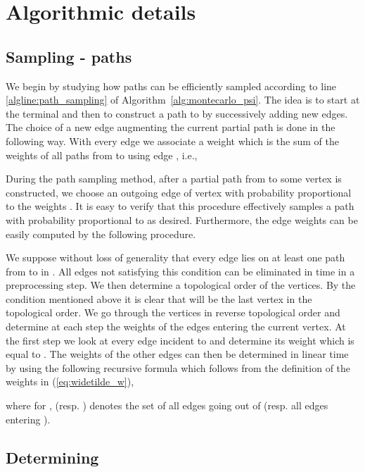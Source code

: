 \documentclass{article}
\begin{document}
\section{Algorithmic details}\label{sec:technical_details}

\subsection{Sampling \texorpdfstring{{}-{}}{-} paths}

We begin by studying how paths can be efficiently sampled
according to line \ref{algline:path_sampling} of Algorithm~\ref{alg:montecarlo_psi}.
The idea is to start at the terminal
 and then to construct a path to  by successively
adding new edges. The choice of a new edge augmenting the
current partial path is done in the following way. With every
edge  we associate a weight 
which is the sum of the weights of all paths from  to 
using edge , i.e.,


During the path sampling method, after a partial path from
 to some vertex  is constructed, we choose an
outgoing edge of vertex  with probability
proportional to the weights . It is easy to
verify that this procedure effectively samples a path
 with probability proportional to
 as desired. Furthermore, the edge weights
 can be easily computed by the following
procedure.

We suppose without loss of generality that every edge lies
on at least one path from  to  in . All edges not
satisfying this condition can be eliminated in  time
in a preprocessing step. We then determine a
topological order of the vertices. By the condition mentioned above
it is clear that  will be the last vertex in
the topological order. We go through the vertices in reverse topological order
and determine at each step the weights  of the
edges entering the current vertex. At the first step we look
at every edge  incident to  and determine its weight
 which is equal to . The weights of
the other edges can then be determined in linear time
by using the following recursive
formula which follows from the definition of the weights
 in (\ref{eq:widetilde_w}),


\noindent
where for ,  (resp. ) denotes the set of all
edges going out of  (resp. all edges entering ).

\subsection{Determining \texorpdfstring{{}}{}}
\end{document}
